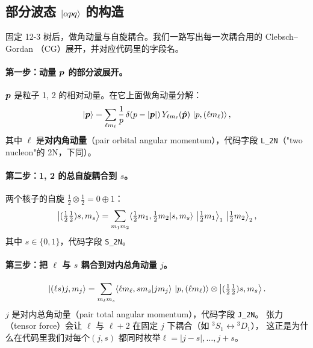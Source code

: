 \subsection{部分波态 \(\ket{\alpha p q}\) 的构造}
\label{subsec:ch03-pwstate}

固定 12-3 树后，做角动量与自旋耦合。我们一路写出每一次耦合用的 Clebsch–Gordan
（CG）展开，并对应代码里的字段名。

\paragraph{第一步：动量 \(\bm{p}\) 的部分波展开。}
\(\bm{p}\) 是粒子 1, 2 的相对动量。在它上面做角动量分解：
\begin{equation}
\label{eq:ch03-p-pw}
\ket{\bm{p}}
= \sum_{\ell m_\ell} \frac{1}{p}\,\delta(p - |\bm{p}|)\,
  Y_{\ell m_\ell}(\hat{\bm{p}})\,
  \ket{p, (\ell m_\ell)},
\end{equation}
其中 \(\ell\) 是\textbf{对内角动量}（pair orbital angular momentum），代码字段
\verb|L_2N|（"two nucleon"的 2N，下同）。

\paragraph{第二步：1, 2 的总自旋耦合到 \(s\)。}
两个核子的自旋 \(\tfrac{1}{2}\otimes\tfrac{1}{2} = 0 \oplus 1\)：
\begin{equation}
\label{eq:ch03-spin-couple}
\ket{(\tfrac{1}{2}\tfrac{1}{2}) s, m_s}
= \sum_{m_1 m_2} \langle \tfrac{1}{2} m_1, \tfrac{1}{2} m_2 | s, m_s \rangle\,
  \ket{\tfrac{1}{2} m_1}_1\,\ket{\tfrac{1}{2} m_2}_2,
\end{equation}
其中 \(s \in \{0, 1\}\)，代码字段 \verb|S_2N|。

\paragraph{第三步：把 \(\ell\) 与 \(s\) 耦合到对内总角动量 \(j\)。}
\begin{equation}
\label{eq:ch03-pair-J}
\ket{(\ell s) j, m_j}
= \sum_{m_\ell m_s} \langle \ell m_\ell, s m_s | j m_j \rangle\,
  \ket{p, (\ell m_\ell)} \otimes \ket{(\tfrac{1}{2}\tfrac{1}{2}) s, m_s}.
\end{equation}
\(j\) 是对内总角动量（pair total angular momentum），代码字段 \verb|J_2N|。
张力（tensor force）会让 \(\ell\) 与 \(\ell + 2\) 在固定 \(j\) 下耦合（如 \({}^3S_1 \leftrightarrow {}^3D_1\)），
这正是为什么在代码里我们对每个\((j, s)\) 都同时枚举\(\ell = |j-s|, \ldots, j+s\)。

